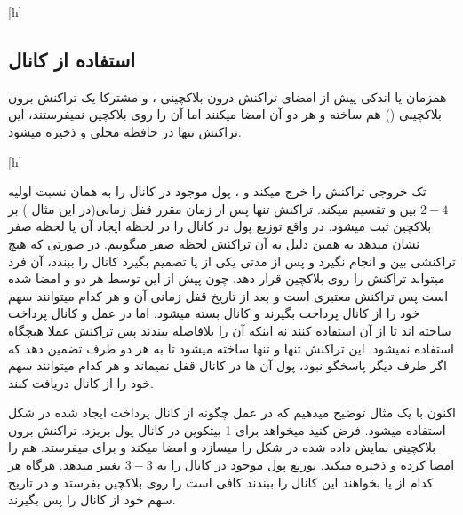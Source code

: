 [h]
\subsection{استفاده از کانال}
همزمان یا اندکی پیش از امضای تراکنش درون بلاکچینی ،   و   مشترکا یک تراکنش برون بلاکچینی () هم ساخته و هر دو آن امضا میکنند اما آن را روی بلاکچین نمیفرستند، این تراکنش تنها در حافظه محلی   و   ذخیره میشود. 

[h]



 تک خروجی تراکنش  را خرج میکند و ، پول موجود در کانال را به همان نسبت اولیه $2-4$ بین   و   تقسیم میکند.
تراکنش  تنها پس از زمان مقرر قفل زمانی(در این مثال ) بر بلاکچین ثبت میشود.
 در واقع توزیع پول در کانال را در لحظه ایجاد آن یا لحظه صفر نشان میدهد به همین دلیل به آن تراکنش لحظه صفر میگوییم. در صورتی که هیچ تراکنشی بین   و    انجام نگیرد و پس از مدتی یکی از   یا   تصمیم بگیرد کانال را ببندد، آن فرد میتواند تراکنش  را روی بلاکچین قرار دهد. چون   پیش از این توسط هر دو   و   امضا شده است پس تراکنش معتبری است و بعد از تاریخ  قفل زمانی آن   و    هر کدام میتوانند سهم خود را از کانال پرداخت بگیرند و کانال بسته میشود. اما در عمل   و    کانال پرداخت ساخته اند تا از آن استفاده کنند نه اینکه آن را بلافاصله ببندند پس تراکنش  عملا هیچگاه استفاده نمیشود. این تراکنش تنها و تنها ساخته میشود تا به هر دو طرف تضمین دهد که اگر طرف دیگر پاسخگو نبود، پول آن ها در کانال قفل نمیماند و هر کدام میتوانند سهم خود را از کانال دریافت کنند.

اکنون با یک مثال توضیح میدهیم که در عمل چگونه از کانال پرداخت ایجاد شده در شکل  استفاده میشود. فرض کنید   میخواهد برای  1 بیتکوین در کانال پول بریزد.  تراکنش برون بلاکچینی  نمایش داده شده در شکل  را میسازد و امضا میکند و برای  میفرستد.  هم  را امضا کرده و ذخیره میکند.  توزیع پول موجود در کانال را به $3-3$ تغییر میدهد. هرگاه هر کدام از    یا   بخواهند این کانال را ببندند کافی است  را روی بلاکچین بفرستد و در تاریخ  سهم خود از کانال را پس بگیرند. 

